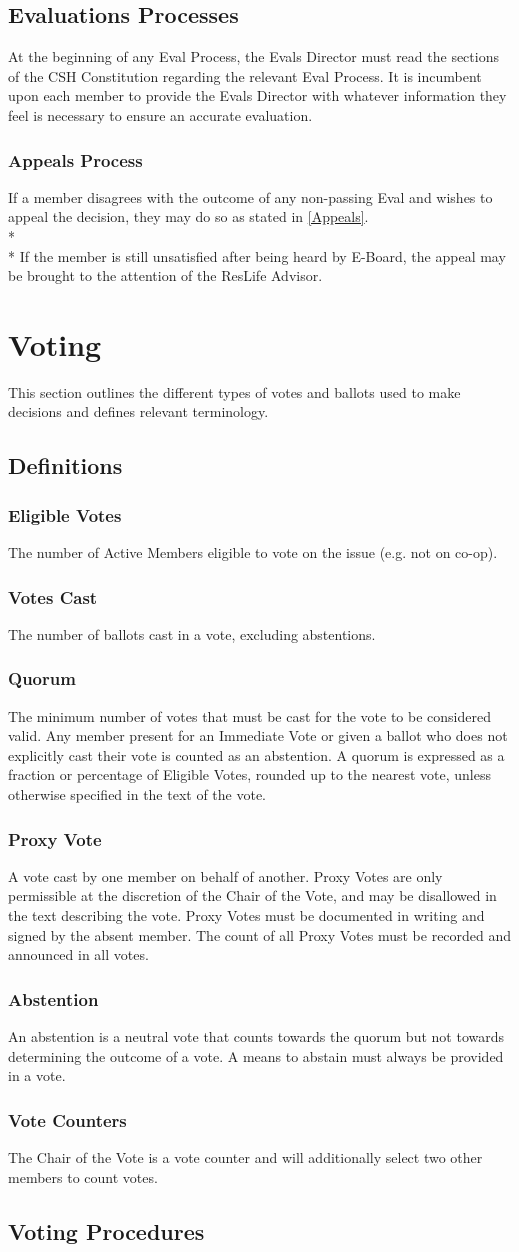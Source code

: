 \documentclass{article}
\newcommand{\article}[1]{\section{#1} \label{#1}}
\newcommand{\asection}[1]{\subsection{#1} \label{#1}}
\newcommand{\asubsection}[1]{\subsubsection{#1} \label{#1}}
\begin{document}
\asection{Evaluations Processes}
At the beginning of any Eval Process, the Evals Director must read the sections of the CSH Constitution regarding the relevant Eval Process.
It is incumbent upon each member to provide the Evals Director with whatever information they feel is necessary to ensure an accurate evaluation.

\asubsection{Appeals Process}
If a member disagrees with the outcome of any non-passing Eval and wishes to appeal the decision, they may do so as stated in \ref{Appeals}.
\\* \\*
If the member is still unsatisfied after being heard by E-Board, the appeal may be brought to the attention of the ResLife Advisor.

\article{Voting}
This section outlines the different types of votes and ballots used to make decisions and defines relevant terminology.

\asection{Definitions}

\asubsection{Eligible Votes}
The number of Active Members eligible to vote on the issue (e.g. not on co-op).

\asubsection{Votes Cast}
The number of ballots cast in a vote, excluding abstentions.

\asubsection{Quorum}
The minimum number of votes that must be cast for the vote to be considered valid.
Any member present for an Immediate Vote or given a ballot who does not explicitly cast their vote is counted as an abstention.
A quorum is expressed as a fraction or percentage of Eligible Votes, rounded up to the nearest vote, unless otherwise specified in the text of the vote.

\asubsection{Proxy Vote}
A vote cast by one member on behalf of another.
Proxy Votes are only permissible at the discretion of the Chair of the Vote, and may be disallowed in the text describing the vote.
Proxy Votes must be documented in writing and signed by the absent member.
The count of all Proxy Votes must be recorded and announced in all votes.

\asubsection{Abstention}
An abstention is a neutral vote that counts towards the quorum but not towards determining the outcome of a vote.
A means to abstain must always be provided in a vote.

\asubsection{Vote Counters}
The Chair of the Vote is a vote counter and will additionally select two other members to count votes.

\asection{Voting Procedures}
\end{document}
